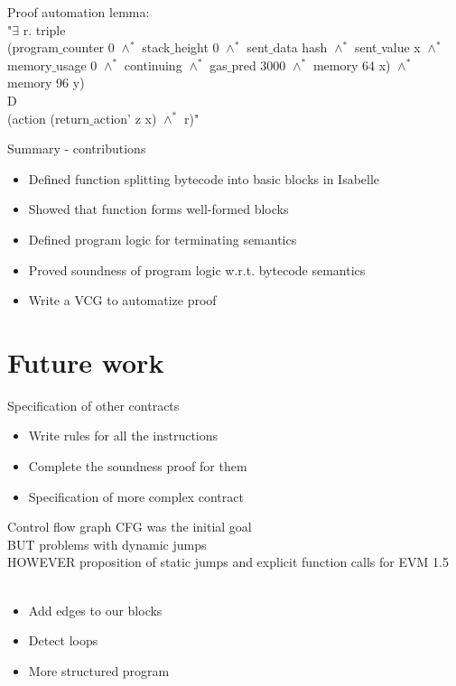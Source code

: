 \documentclass{beamer}
\begin{document}
\begin{frame}{Proof automation}
	\footnotesize
	\ttfamily
	\textcolor{Data61 dark mint}{lemma}:\\
	"$\exists$ r. triple \\
	(program$\_$counter 0 $\wedge^*$ stack$\_$height 0 $\wedge^*$ sent$\_$data hash $\wedge^*$ sent$\_$value x $\wedge^*$
	memory$\_$usage 0 $\wedge^*$ continuing $\wedge^*$ gas$\_$pred 3000 $\wedge^*$ memory 64 x) $\wedge^*$
	memory 96 y)\\
	D\\
	(action (return$\_$action' z x) $\wedge^*$ r)"
\end{frame}

\begin{frame}{Summary - contributions}
	\begin{itemize}
		\item Defined function splitting bytecode into basic blocks in Isabelle
		\item Showed that function forms well-formed blocks
		\item Defined program logic for terminating semantics
		\item Proved soundness of program logic w.r.t. bytecode semantics
		\item Write a VCG to automatize proof
	\end{itemize}

\end{frame}

\part{Future work}
\frame{\partpage}

\begin{frame}{Specification of other contracts}
	\begin{itemize}
		\item Write rules for all the instructions
		\item Complete the soundness proof for them
		\item Specification of more complex contract
	\end{itemize}
\end{frame}

\begin{frame}{Control flow graph}
	CFG was the initial goal\\
	BUT problems with dynamic jumps\\
	HOWEVER proposition of static jumps and explicit function calls for EVM 1.5
	\\~\\
	\begin{itemize}
		\item Add edges to our blocks
		\item Detect loops
		\item More structured program
	\end{itemize}
\end{frame}




\end{document}
